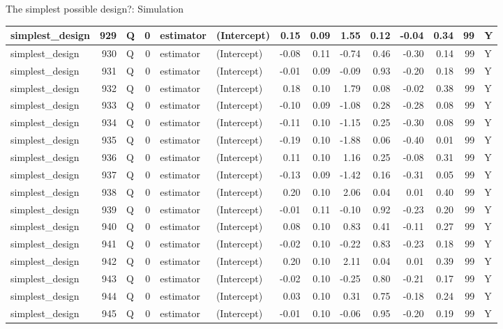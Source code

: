 \documentclass[
  11pt,
  ignorenonframetext,
]{beamer}
\begin{document}
\begin{frame}[fragile]{The simplest possible design?: Simulation}
\begin{tabular}{l|r|l|r|l|l|r|r|r|r|r|r|r|l}
\hline
simplest\_design & 929 & Q & 0 & estimator & (Intercept) & 0.15 & 0.09 & 1.55 & 0.12 & -0.04 & 0.34 & 99 & Y\\
\hline
simplest\_design & 930 & Q & 0 & estimator & (Intercept) & -0.08 & 0.11 & -0.74 & 0.46 & -0.30 & 0.14 & 99 & Y\\
\hline
simplest\_design & 931 & Q & 0 & estimator & (Intercept) & -0.01 & 0.09 & -0.09 & 0.93 & -0.20 & 0.18 & 99 & Y\\
\hline
simplest\_design & 932 & Q & 0 & estimator & (Intercept) & 0.18 & 0.10 & 1.79 & 0.08 & -0.02 & 0.38 & 99 & Y\\
\hline
simplest\_design & 933 & Q & 0 & estimator & (Intercept) & -0.10 & 0.09 & -1.08 & 0.28 & -0.28 & 0.08 & 99 & Y\\
\hline
simplest\_design & 934 & Q & 0 & estimator & (Intercept) & -0.11 & 0.10 & -1.15 & 0.25 & -0.30 & 0.08 & 99 & Y\\
\hline
simplest\_design & 935 & Q & 0 & estimator & (Intercept) & -0.19 & 0.10 & -1.88 & 0.06 & -0.40 & 0.01 & 99 & Y\\
\hline
simplest\_design & 936 & Q & 0 & estimator & (Intercept) & 0.11 & 0.10 & 1.16 & 0.25 & -0.08 & 0.31 & 99 & Y\\
\hline
simplest\_design & 937 & Q & 0 & estimator & (Intercept) & -0.13 & 0.09 & -1.42 & 0.16 & -0.31 & 0.05 & 99 & Y\\
\hline
simplest\_design & 938 & Q & 0 & estimator & (Intercept) & 0.20 & 0.10 & 2.06 & 0.04 & 0.01 & 0.40 & 99 & Y\\
\hline
simplest\_design & 939 & Q & 0 & estimator & (Intercept) & -0.01 & 0.11 & -0.10 & 0.92 & -0.23 & 0.20 & 99 & Y\\
\hline
simplest\_design & 940 & Q & 0 & estimator & (Intercept) & 0.08 & 0.10 & 0.83 & 0.41 & -0.11 & 0.27 & 99 & Y\\
\hline
simplest\_design & 941 & Q & 0 & estimator & (Intercept) & -0.02 & 0.10 & -0.22 & 0.83 & -0.23 & 0.18 & 99 & Y\\
\hline
simplest\_design & 942 & Q & 0 & estimator & (Intercept) & 0.20 & 0.10 & 2.11 & 0.04 & 0.01 & 0.39 & 99 & Y\\
\hline
simplest\_design & 943 & Q & 0 & estimator & (Intercept) & -0.02 & 0.10 & -0.25 & 0.80 & -0.21 & 0.17 & 99 & Y\\
\hline
simplest\_design & 944 & Q & 0 & estimator & (Intercept) & 0.03 & 0.10 & 0.31 & 0.75 & -0.18 & 0.24 & 99 & Y\\
\hline
simplest\_design & 945 & Q & 0 & estimator & (Intercept) & -0.01 & 0.10 & -0.06 & 0.95 & -0.20 & 0.19 & 99 & Y\\

\end{tabular}
\end{frame}
\end{document}
